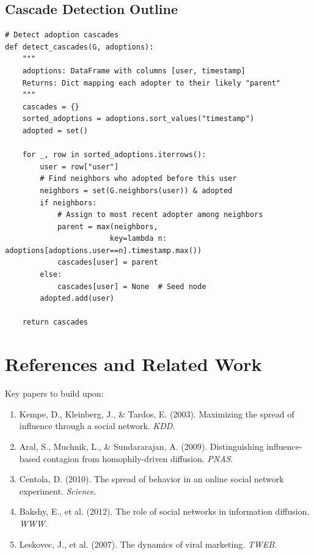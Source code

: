 \documentclass[11pt,letterpaper]{article}
\begin{document}
\subsection{Cascade Detection Outline}

\begin{verbatim}
# Detect adoption cascades
def detect_cascades(G, adoptions):
    """
    adoptions: DataFrame with columns [user, timestamp]
    Returns: Dict mapping each adopter to their likely "parent"
    """
    cascades = {}
    sorted_adoptions = adoptions.sort_values("timestamp")
    adopted = set()

    for _, row in sorted_adoptions.iterrows():
        user = row["user"]
        # Find neighbors who adopted before this user
        neighbors = set(G.neighbors(user)) & adopted
        if neighbors:
            # Assign to most recent adopter among neighbors
            parent = max(neighbors,
                        key=lambda n: adoptions[adoptions.user==n].timestamp.max())
            cascades[user] = parent
        else:
            cascades[user] = None  # Seed node
        adopted.add(user)

    return cascades
\end{verbatim}

\section{References and Related Work}

Key papers to build upon:
\begin{enumerate}
    \item Kempe, D., Kleinberg, J., \& Tardos, E. (2003). Maximizing the spread of influence through a social network. \textit{KDD}.
    \item Aral, S., Muchnik, L., \& Sundararajan, A. (2009). Distinguishing influence-based contagion from homophily-driven diffusion. \textit{PNAS}.
    \item Centola, D. (2010). The spread of behavior in an online social network experiment. \textit{Science}.
    \item Bakshy, E., et al. (2012). The role of social networks in information diffusion. \textit{WWW}.
    \item Leskovec, J., et al. (2007). The dynamics of viral marketing. \textit{TWEB}.
\end{enumerate}
\end{document}
